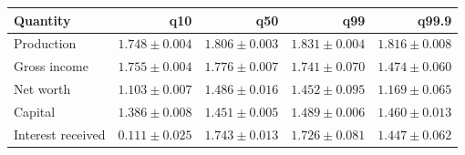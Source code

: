 \begin{longtable}{@{}lrrrr@{}}
\toprule
Quantity & q10 & q50 & q99 & q99.9 \\
\midrule
\endhead
Production & $1.748 \pm 0.004$ & $1.806 \pm 0.003$ & $1.831 \pm 0.004$ & $1.816 \pm 0.008$ \\
Gross income & $1.755 \pm 0.004$ & $1.776 \pm 0.007$ & $1.741 \pm 0.070$ & $1.474 \pm 0.060$ \\
Net worth & $1.103 \pm 0.007$ & $1.486 \pm 0.016$ & $1.452 \pm 0.095$ & $1.169 \pm 0.065$ \\
Capital & $1.386 \pm 0.008$ & $1.451 \pm 0.005$ & $1.489 \pm 0.006$ & $1.460 \pm 0.013$ \\
Interest received & $0.111 \pm 0.025$ & $1.743 \pm 0.013$ & $1.726 \pm 0.081$ & $1.447 \pm 0.062$ \\
\bottomrule
\end{longtable}
